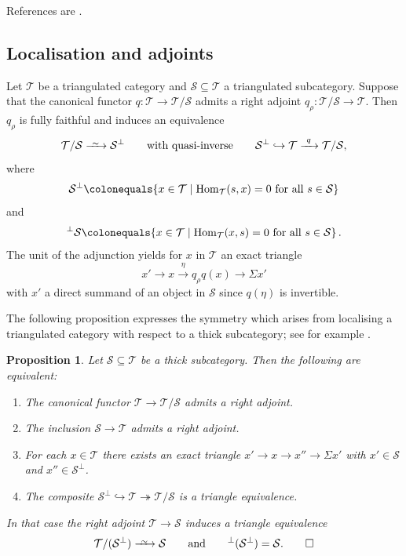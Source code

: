 \documentclass{amsart}[a4]
\newtheorem{proposition}[theorem]{Proposition}
\theoremstyle{definition}
\theoremstyle{remark}
\numberwithin{equation}{section}
\newcommand{\Hom}{\operatorname{Hom}}
\newcommand{\longiso}{\xrightarrow{\
    \raisebox{-.6ex}[0ex][0ex]{$\scriptstyle{\sim}$}\ }}
\newcommand{\lto}{\longrightarrow}
\newcommand{\cat}{\mathcal}
\newcommand{\Si}{\Sigma}
\let\Sigma\varSigma
\begin{document}
References are \cite{Benson/Iyengar/Krause:2008a,Hovey/Palmieri/Strickland:1997a}.



\subsection*{Localisation  and  adjoints}

Let $\cat T$ be a triangulated category and $\cat S\subseteq\cat T$ a triangulated
subcategory. Suppose that the canonical functor $q\colon\cat T\to\cat T/\cat S$
admits a right adjoint $q_\rho\colon \cat T/\cat S\to\cat T$.
 Then $q_\rho$ is fully
faithful and induces an equivalence
\[\cat T/\cat S\longiso\cat S^\perp\qquad\text{with quasi-inverse}\qquad
  \cat S^\perp\hookrightarrow\cat T\xrightarrow{\ q\ }\cat T/\cat S,\]
where
\[
  \cat S^\perp\colonequals\{x\in\cat T\mid \Hom_\cat T(s,x)=0\text{ for all
  }s\in\cat S\}
\] and
\[
  ^\perp\cat S\colonequals\{x\in\cat T\mid \Hom_\cat T(x,s)=0\text{ for all
                }s\in\cat S\}\,.
\]
The
unit of the adjunction yields for $x$ in $\cat T$ an exact triangle
\[x'\lto x\stackrel{\eta}\lto q_\rho q(x)\lto \Si x'\]
with $x'$ a direct summand of an object in $\cat S$ since $q(\eta)$ is
invertible.

The following proposition expresses the symmetry which arises from
localising a triangulated category with respect to a thick
subcategory; see for example \cite[Proposition~3.2.8]{Krause:2022a}.

\begin{proposition}\label{pr:verdier-adjoint}\pushQED{\qed} 
  Let $\cat S\subseteq\cat T$ be a thick subcategory. Then the following are equivalent:
\begin{enumerate}
\item The canonical functor $\cat T\to\cat T/\cat S$ admits a right adjoint. 
\item The inclusion $\cat S\to\cat T$ admits a right adjoint.
\item For each $x\in\cat T$ there exists an exact triangle
  $x'\to x\to x''\to\Si x'$ with $x'\in\cat S$ and $x''\in\cat S^\perp$.
\item The composite $\cat S^\perp\hookrightarrow\cat T\twoheadrightarrow\cat T/\cat S$ is a triangle equivalence.
\end{enumerate}
 In that case the right
  adjoint $\cat T\to\cat S$ induces a triangle
  equivalence
  \[\cat T/(\cat S^\perp)\longiso\cat S\qquad\text{and}\qquad^\perp(\cat S^\perp)=\cat S.\qedhere\]
\end{proposition}
\end{document}
